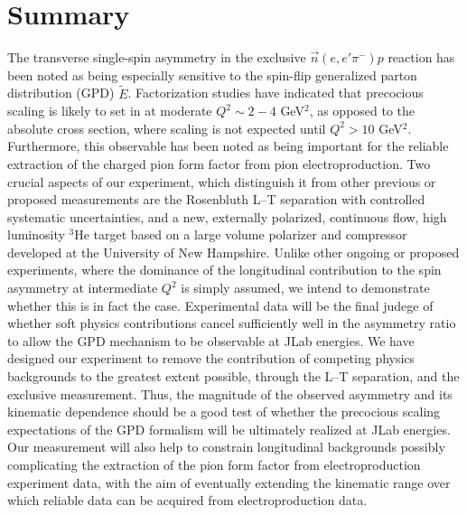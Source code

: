 \documentclass{article}
\begin{document}




\section{Summary}

The transverse single-spin asymmetry in the exclusive $\vec{n}(e,e'\pi^-)p$
reaction has been noted as being
especially sensitive to the spin-flip generalized parton distribution (GPD)
$\tilde{E}$.  Factorization studies have indicated that precocious scaling
is likely to set in at moderate $Q^2\sim 2-4$ GeV$^2$, as opposed to the
absolute cross section, where scaling is not expected until $Q^2>10$ GeV$^2$.
Furthermore, this observable has been noted as being important for the reliable
extraction of the charged pion form factor from pion electroproduction.  Two
crucial aspects of our experiment, which distinguish it from other previous or
proposed measurements are the Rosenbluth L--T separation with controlled
systematic uncertainties, and a new, externally polarized, continuous flow,
high luminosity $^3$He target based on a large volume polarizer and compressor
developed at the University of New Hampshire.  Unlike other ongoing or proposed
experiments, where the dominance of the longitudinal contribution to the spin
asymmetry at intermediate $Q^2$ is simply assumed, we intend to demonstrate
whether this is in fact the case.  Experimental data will be the final judege
of whether soft physics contributions cancel sufficiently well in the asymmetry
ratio to allow the GPD mechanism to be observable at JLab energies.  We have
designed our experiment to remove the contribution of competing physics
backgrounds to the greatest extent possible, through the L--T separation, and
the exclusive measurement.  Thus, the magnitude of the observed asymmetry and
its kinematic dependence should be a good test of whether the precocious
scaling expectations of the GPD formalism will be ultimately realized at JLab
energies.  Our measurement will also help to constrain longitudinal backgrounds
possibly complicating the extraction of the pion form factor from
electroproduction experiment data, with the aim of eventually extending the
kinematic range over which reliable data can be acquired from electroproduction
data.


 
\newpage


\newpage

\end{document}
